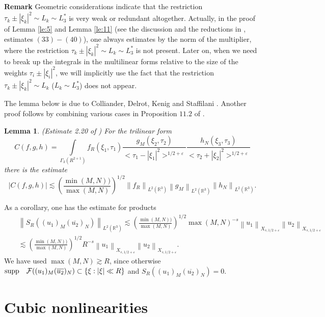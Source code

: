 \documentclass[draft,11pt,leqno]{amsart}
\newtheorem{lemma}{Lemma}
\newcommand{\q}{\quad}
\newcommand{\norm}[2]{{\left\| #1 \right\|}_{#2}}
\newcommand{\Ga}{\Gamma}
\newcommand{\ve}{\varepsilon}
\newcommand{\rthree}{\mathbb R^3}
\newcommand{\cf}{\mathcal F}
\newcommand{\intl}{\int\limits}
\newcommand{\f}{\displaystyle\frac}
\newcommand{\ov}{\overline}
\newcommand{\lthree}{{L_3^{*}}}
\begin{document}
{\bf Remark} Geometric considerations indicate that the restriction 
$\tau_k\pm|\xi_k|^2\sim L_k \sim \lthree$ 
is very weak or redundant altogether. Actually, in the proof of
Lemma  \ref{le:5} and Lemma \ref{le:11} (see the discussion 
and the reductions in \cite{Tao}, estimates $(33)-(40)$), one always
estimates by the norm of the  multiplier, where the restriction 
$\tau_k\pm|\xi_k|^2\sim L_k 
\sim \lthree$ is not present. Later on, when we need to break up the 
integrals in the multilinear forms  relative to the size of the weights 
$\tau_i\pm|\xi_i|^2$, we will implicitly use the fact that the restriction 
$\tau_k\pm|\xi_k|^2\sim L_k$ ($L_k\sim\lthree$) does not appear.

The lemma below is due to Colliander, Delrot, Kenig and Staffilani \cite{Kenig}. Another proof follows by combining various cases in Proposition $11.2$ 
of \cite{Tao}. 
 
\begin{lemma}(Estimate 2.20 of \cite{Kenig})
\label{le:3}
For the trilinear form
$$
C(f,g,h)=\intl_{\Ga_3(R^{2+1})} f_R(\xi_1,\tau_1) \f{g_M(\xi_2,\tau_2)}{<\tau_1-|\xi_1|^2>^{1/2+\ve}}
\f{h_N(\xi_3,\tau_3)}{<\tau_2+|\xi_2|^2>^{1/2+\ve}}
$$
there is the estimate
\begin{equation}
\label{eq:6432}
|C(f,g,h)|\lesssim \left(\f{\min(M,N))}{\max(M,N)}\right)^{1/2}\norm{f_R}{L^2(\rthree)}
\norm{g_M}{L^2(\rthree)}
\norm{h_N}{L^2(\rthree)}.
\end{equation}
\end{lemma}
As a corollary, one has the estimate for products
\begin{eqnarray}
\label{eq:56}
& &\norm{S_R( (u_1)_M(\overline{u_2})_N)}{L^2(\rthree)}\lesssim
\left(\f{\min(M,N))}{\max(M,N)}\right)^{1/2} \max(M,N)^{-s}
\norm{u_1}{X_{s,1/2+\ve}}
\norm{u_2}{X_{s,1/2+\ve}} \\
& &\lesssim \left(\f{\min(M,N))}
{\max(M,N)}\right)^{1/2} R^{-s}\norm{u_1}{X_{s,1/2+\ve}}
\norm{u_2}{X_{s,1/2+\ve}}.
\nonumber
\end{eqnarray}
We have used $\max(M,N)\gtrsim R$, since otherwise $\textup{supp}
\q \cf((u_1)_M (\ov{u_2})_N) \subset \{\xi:|\xi|\ll R\}$ and
$S_R((u_1)_M (\ov{u_2})_N)=0$.

\vspace{.5cm}

\section{Cubic nonlinearities}
\label{sec:89}
\end{document}
